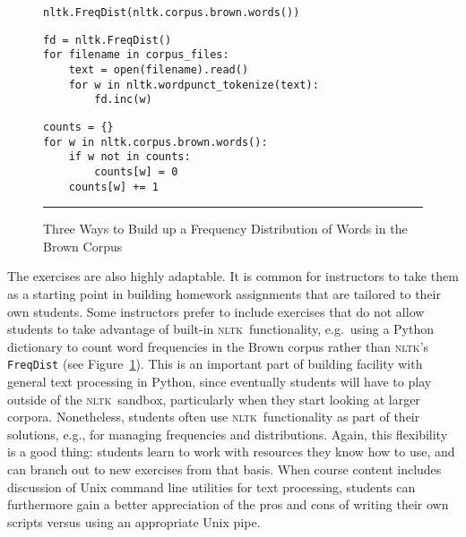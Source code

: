 \documentclass[11pt]{article}
\newcommand{\NLTK}{\textsc{nltk}}
\newcommand{\code}[1]{\texttt{\small #1}}
\begin{document}



\begin{figure}
{\footnotesize
\begin{verbatim}
nltk.FreqDist(nltk.corpus.brown.words())
\end{verbatim}
\medskip

\begin{verbatim}
fd = nltk.FreqDist()
for filename in corpus_files:
    text = open(filename).read()
    for w in nltk.wordpunct_tokenize(text):
        fd.inc(w)
\end{verbatim}
\medskip

\begin{verbatim}
counts = {}
for w in nltk.corpus.brown.words():
    if w not in counts:
        counts[w] = 0
    counts[w] += 1
\end{verbatim}
}
\caption{Three Ways to Build up a Frequency Distribution of Words in the Brown Corpus}
\label{fig:freqdist}
\vspace*{1ex}
\hrule
\end{figure}

The exercises are also highly adaptable. It is common for instructors
to take them as a starting point in building homework assignments that
are tailored to their own students.  Some instructors prefer to
include exercises that do not allow students to take advantage of
built-in \NLTK\ functionality, e.g.\  using a Python dictionary to
count word frequencies in the Brown corpus rather than \NLTK 's
\code{FreqDist} (see Figure~\ref{fig:freqdist}).  This is an important
part of building facility with general text processing in Python,
since eventually students will have to play outside of the \NLTK\
sandbox, particularly when they start looking at larger
corpora. Nonetheless, students often use \NLTK\ functionality as part
of their solutions, e.g., for managing frequencies and
distributions. Again, this flexibility is a good thing: students learn
to work with resources they know how to use, and can branch out to new
exercises from that basis. When course content includes discussion of
Unix command line utilities for text processing, students can
furthermore gain a better appreciation of the pros and cons of writing
their own scripts versus using an appropriate Unix pipe.
\end{document}
